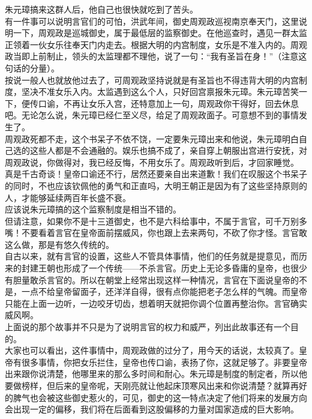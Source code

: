 \begin{multicols}{\theparacolNo}
朱元璋搞来这群人后，他自己也很快就吃到了苦头。\\

有一件事可以说明言官们的可怕，洪武年间，御史周观政巡视南京奉天门，这里说明一下，周观政是巡城御史，属于最低层的监察御史。在他巡查时，遇见一群太监正领着一伙女乐往奉天门内走去。根据大明的内宫制度，女乐是不准入内的。周观政当即上前制止，领头的太监理都不理他，说了一句：“我有圣旨在身！”（注意这句话的分量）。\\

按说一般人也就放他过去了，可周观政坚持说就是有圣旨也不得违背大明的内宫制度，坚决不准女乐入内。太监遇到这么个人，只好回宫禀报朱元璋。朱元璋苦笑一下，便传口谕，不再让女乐入宫，还特意加上一句，周观政你干得好，回去休息吧。无论怎么说，朱元璋已经仁至义尽，给足了周观政面子。可意想不到的事情发生了。\\

周观政死都不走，这个书呆子不依不饶，一定要朱元璋出来和他说，朱元璋明白自己选的这些人都是不会通融的。娱乐也搞不成了，亲自穿上朝服出宫进行安抚，对周观政说，你做得对，我已经反悔，不用女乐了。周观政听到后，才回家睡觉。\\

真是千古奇谈！皇帝口谕还不行，居然还要亲自出来道歉！我们在叹服这个书呆子的同时，不也应该钦佩他的勇气和正直吗，大明王朝正是因为有了这些坚持原则的人，才能够延续两百年长盛不衰。\\

应该说朱元璋搞的这个监察制度是相当不错的。\\

但请注意，如果你不是十三道御史，也不是六科给事中，不属于言官，可千万别多嘴！不要看着言官在皇帝面前摆威风，你也跟上去来两句，不砍了你才怪。言官敢这么做，那是有悠久传统的。\\

自古以来，就有言官的设置，这些人不管具体事情，他们的任务就是提意见，而历来的封建王朝也形成了一个传统——不杀言官。历史上无论多昏庸的皇帝，也很少有胆量敢杀言官的。所以在朝堂上经常出现这样一种情况，言官在下面说皇帝的不是，一点不给皇帝留面子，还洋洋自得，很有点你能把老子怎么样的气魄。而皇帝只能在上面一边听，一边咬牙切齿，想着明天就把你调个位置再整治你。言官确实威风啊。\\

上面说的那个故事并不只是为了说明言官的权力和威严，列出此故事还有一个目的。\\

大家也可以看出，这件事情中，周观政做的过分了，用今天的话说，太较真了。皇帝有很多事情，你把女乐拦住，皇帝也传口谕，表扬了你，这就足够了。非要皇帝出来跟你说清楚，他哪里来的那么多时间和耐心。朱元璋是制度的制定者，所以他要做榜样，但后来的皇帝呢，天刚亮就让他起床顶寒风出来和你说清楚？就算再好的脾气也会被这些御史惹火的，可见，御史的这一特点决定了他们将来的发展方向会出现一定的偏移，我们将在后面看到这股偏移的力量对国家造成的巨大影响。\\


\end{multicols}

